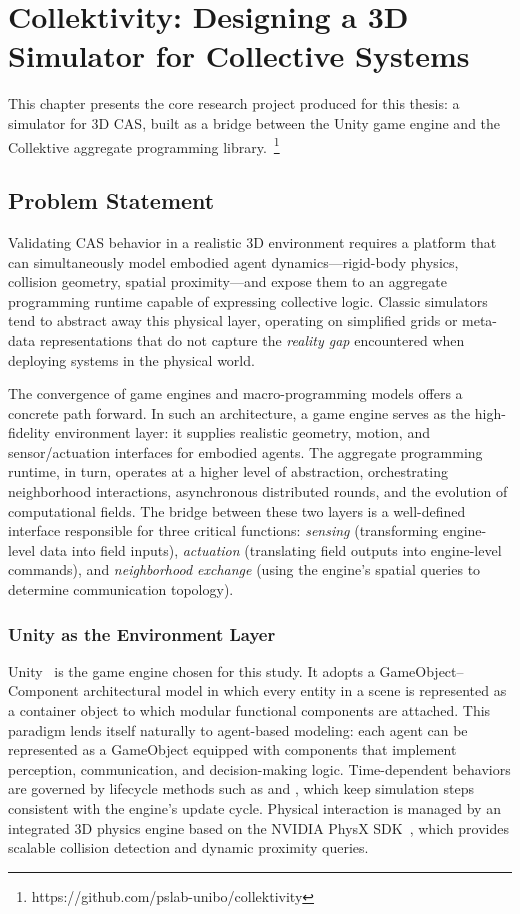\chapter{Collektivity: Designing a 3D Simulator for Collective Systems} \label{chap:collektivity}

This chapter presents the core research project produced for this thesis: a simulator for 3D \ac{CAS}, built as a bridge between the Unity game engine and the Collektive aggregate programming library.~\footnote{https://github.com/pslab-unibo/collektivity}

\section{Problem Statement}

Validating \ac{CAS} behavior in a realistic 3D environment requires a platform that can simultaneously model embodied agent dynamics—rigid-body physics, collision geometry, spatial proximity—and expose them to an aggregate programming runtime capable of expressing collective logic. Classic simulators tend to abstract away this physical layer, operating on simplified grids or meta-data representations that do not capture the \textit{reality gap} encountered when deploying systems in the physical world.

The convergence of game engines and macro-programming models offers a concrete path forward. In such an architecture, a game engine serves as the high-fidelity environment layer: it supplies realistic geometry, motion, and sensor/actuation interfaces for embodied agents. The aggregate programming runtime, in turn, operates at a higher level of abstraction, orchestrating neighborhood interactions, asynchronous distributed rounds, and the evolution of computational fields. The bridge between these two layers is a well-defined interface responsible for three critical functions: \textit{sensing} (transforming engine-level data into field inputs), \textit{actuation} (translating field outputs into engine-level commands), and \textit{neighborhood exchange} (using the engine's spatial queries to determine communication topology).

\subsection{Unity as the Environment Layer}

Unity~\cite{unity_manual} is the game engine chosen for this study. It adopts a GameObject–Component architectural model in which every entity in a scene is represented as a container object to which modular functional components are attached. This paradigm lends itself naturally to agent-based modeling: each agent can be represented as a GameObject equipped with components that implement perception, communication, and decision-making logic. Time-dependent behaviors are governed by lifecycle methods such as  and , which keep simulation steps consistent with the engine's update cycle. Physical interaction is managed by an integrated 3D physics engine based on the NVIDIA PhysX SDK~\cite{unity_physics}, which provides scalable collision detection and dynamic proximity queries.

